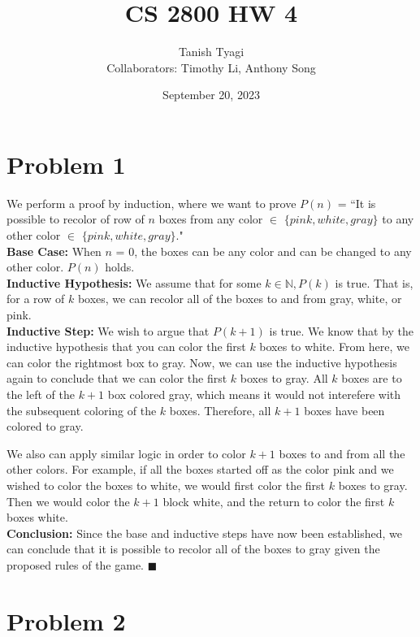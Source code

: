 \documentclass{article}
\title{\textbf{CS 2800 HW 4}}
\author{Tanish Tyagi \\ Collaborators: Timothy Li, Anthony Song}
\date{September 20, 2023}
\begin{document}
\maketitle

\section{Problem 1}

We perform a proof by induction, where we want to prove $P(n)$ = “It is possible to recolor of row of $n$ boxes from any color $\in$ $\{pink, white, gray\}$ to any other color $\in$ $\{pink, white, gray\}$." \\

\textbf{Base Case:} When $n$ = 0, the boxes can be any color and can be changed to any other color. $P(n)$ holds. \\

\textbf{Inductive Hypothesis:} We assume that for some $k \in \mathbb{N}, P(k)$ is true. That is, for a row of $k$ boxes, we can recolor all of the boxes to and from gray, white, or pink. \\

\textbf{Inductive Step:} We wish to argue that $P(k+1)$ is true. We know that by the inductive hypothesis that you can color the first $k$ boxes to white. From here, we can color the rightmost box to gray. Now, we can use the inductive hypothesis again to conclude that we can color the first $k$ boxes to gray. All $k$ boxes are to the left of the $k+1$ box colored gray, which means it would not interefere with the subsequent coloring of the $k$ boxes. Therefore, all $k+1$ boxes have been colored to gray.

We also can apply similar logic in order to color $k+1$ boxes to and from all the other colors. For example, if all the boxes started off as the color pink and we wished to color the boxes to white, we would first color the first $k$ boxes to gray. Then we would color the $k+1$ block white, and the return to color the first $k$ boxes white. \\

\textbf{Conclusion:} Since the base and inductive steps have now been established, we can conclude that it is possible to recolor all of the boxes to gray given the proposed rules of the game. $\blacksquare$

\section{Problem 2}
\end{document}
